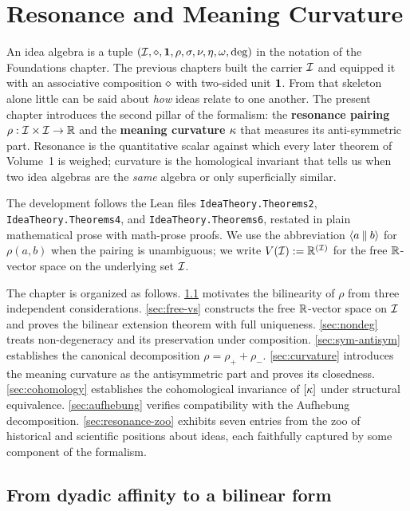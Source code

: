 \chapter{Resonance and Meaning Curvature}\label{ch:resonance}

An idea algebra is a tuple $(\mathcal{I},\mathbin{\diamond},\mathbf{1},\rho,\sigma,\nu,\eta,\omega,\deg)$ in the notation of the Foundations chapter. The previous chapters built the carrier $\mathcal{I}$ and equipped it with an
associative composition $\mathbin{\diamond}$ with two-sided unit $\mathbf{1}$. From that
skeleton alone little can be said about \emph{how} ideas relate to one
another. The present chapter introduces the second pillar of the formalism:
the \textbf{resonance pairing} $\rho:\mathcal{I}\times\mathcal{I}\to\mathbb{R}$ and the
\textbf{meaning curvature} $\kappa$ that measures its anti-symmetric part.
Resonance is the quantitative scalar against which every later theorem of
Volume~1 is weighed; curvature is the homological invariant that tells us
when two idea algebras are the \emph{same} algebra or only superficially
similar.

The development follows the Lean files
\texttt{IdeaTheory.Theorems2}, \texttt{IdeaTheory.Theorems4}, and
\texttt{IdeaTheory.Theorems6}, restated in plain mathematical prose with
math-prose proofs. We use the abbreviation $\langle a \mathbin{\Vert} b \rangle$ for $\rho(a,b)$ when
the pairing is unambiguous; we write $V(\mathcal{I}):=\mathbb{R}^{(\mathcal{I})}$ for the
free $\mathbb{R}$-vector space on the underlying set $\mathcal{I}$.

The chapter is organized as follows. \cref{sec:why-pairing} motivates the
bilinearity of $\rho$ from three independent considerations.
\cref{sec:free-vs} constructs the free $\mathbb{R}$-vector space on $\mathcal{I}$ and
proves the bilinear extension theorem with full uniqueness.
\cref{sec:nondeg} treats non-degeneracy and its preservation under
composition. \cref{sec:sym-antisym} establishes the canonical
decomposition $\rho=\rho_++\rho_-$. \cref{sec:curvature} introduces the
meaning curvature as the antisymmetric part and proves its closedness.
\cref{sec:cohomology} establishes the cohomological invariance of
$[\kappa]$ under structural equivalence. \cref{sec:aufhebung} verifies
compatibility with the Aufhebung decomposition. \cref{sec:resonance-zoo}
exhibits seven entries from the zoo of historical and scientific
positions about ideas, each faithfully captured by some component of
the formalism.

\section{From dyadic affinity to a bilinear form}\label{sec:why-pairing}

